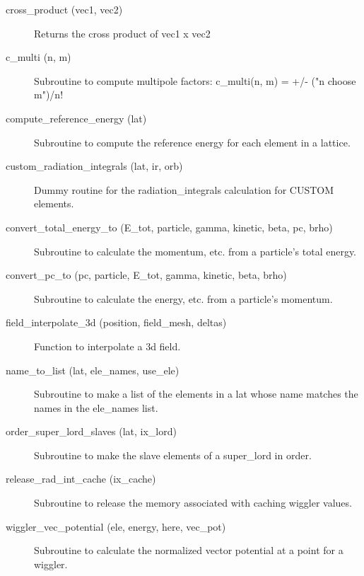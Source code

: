 \begin{description}

\label{r:cross.product}
\item[cross_product (vec1, vec2)] \Newline 
Returns the cross product of vec1 x vec2

\label{r:c.multi}
\item[c_multi (n, m)] \Newline
Subroutine to compute multipole factors: 
c_multi(n, m) = +/- ("n choose m")/n! 

\label{r:compute.reference.energy}
\item[compute_reference_energy (lat)] \Newline
Subroutine to compute the reference energy for each element in a lattice. 

\label{r:custom.radiation.integrals}
\item[custom_radiation_integrals (lat, ir, orb)] \Newline
Dummy routine for the radiation_integrals calculation for CUSTOM elements. 

\label{r:convert.total.energy.to}
\item[convert_total_energy_to (E_tot, particle, gamma, kinetic, beta, pc, brho)] \Newline
Subroutine to calculate the momentum, etc. from a particle's total energy. 

\label{r:convert.pc.to}
\item[convert_pc_to (pc, particle, E_tot, gamma, kinetic, beta, brho)] \Newline
Subroutine to calculate the energy, etc. from a particle's momentum. 

\label{r:field.interpolate.3d}
\item[field_interpolate_3d (position, field_mesh, deltas)] \Newline
Function to interpolate a 3d field. 

\label{r:name.to.list}
\item[name_to_list (lat, ele_names, use_ele)] \Newline
Subroutine to make a list of the elements in a lat 
whose name matches the names in the ele_names list. 

\label{r:order.super.lord.slaves}
\item[order_super_lord_slaves (lat, ix_lord)] \Newline
Subroutine to make the slave elements of a super_lord in order. 

\label{r:release.rad.int.cache}
\item[release_rad_int_cache (ix_cache)] \Newline 
     Subroutine to release the memory associated with caching wiggler values.

\label{r:wiggler.vec.potential}
\item[wiggler_vec_potential (ele, energy, here, vec_pot)] \Newline
Subroutine to calculate the normalized vector potential at a point for a wiggler.

\end{description}

